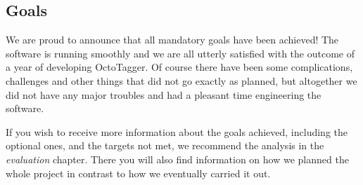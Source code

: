 \subsection{Goals}
We are proud to announce that all mandatory goals have been achieved! The software is running smoothly and we are all utterly satisfied with the outcome of a year of developing OctoTagger. Of course there have been some complications, challenges and other things that did not go exactly as planned, but altogether we did not have any major troubles and had a pleasant time engineering the software.

If you wish to receive more information about the goals achieved, including the optional ones, and the targets not met, we recommend the analysis in the \textit{evaluation} chapter. There you will also find information on how we planned the whole project in contrast to how we eventually carried it out.




















